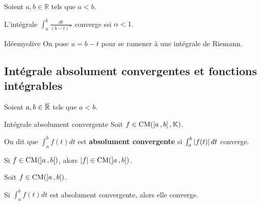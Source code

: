     \begin{prop}{}{}
        Soient $a,b \in \mathbb{R}$ tels que $a < b$. 

        L’intégrale $\int_{a}^{b} \frac{dt}{(b-t)^{\alpha}}$ converge ssi $\alpha < 1$.
    \end{prop}

    \begin{demo}{Idée}{myolive}
        On pose $u = b-t$ pour se ramener à une intégrale de Riemann.
    \end{demo}

\subsection{Intégrale absolument convergentes et fonctions intégrables}

    Soient $a,b \in \overline{\mathbb{R}}$ tels que $a < b$.

    \begin{defi}{Intégrale absolument convergente}{}
        Soit $f \in \operatorname{CM}(\left] a \, , b \right[,\mathbb{K})$. 

        On dit que $\int_{a}^{b} f(t)dt$ est \textbf{absolument convergente} si $\int_{a}^{b} \left\lvert f(t)\right\rvert dt$ converge.
    \end{defi}

    \begin{prop}{}{}
        Si $f \in \operatorname{CM}(\left] a \, , b \right[)$, alors $\left\lvert f\right\rvert \in \operatorname{CM}(\left] a \, , b \right[)$.
    \end{prop}

    \begin{prop}{}{}
        Soit $f \in \operatorname{CM}(\left] a \, , b \right[)$.

        Si $\int_{a}^{b} f(t)dt$ est absolument convergente, alors elle converge.
    \end{prop}

